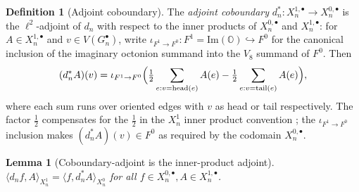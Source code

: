 \documentclass[11pt, a4paper]{amsart}
\newtheorem{lemma}[theorem]{Lemma}
\theoremstyle{definition}
\newtheorem{definition}[theorem]{Definition}
\newcommand{\OO}{\mathbb{O}}
\renewcommand{\Im}{\mathrm{Im}}
\begin{document}
\begin{definition}[Adjoint coboundary]
\label{def:coboundary-adjoint}
The \emph{adjoint coboundary} $d_n^* \colon X_n^{1, \bullet} \to
X_n^{0, \bullet}$ is the $\ell^2$-adjoint of $d_n$ with respect
to the inner products of $X_n^{0, \bullet}$ and $X_n^{1, \bullet}$:
for $A \in X_n^{1, \bullet}$ and $v \in V(G_n^\bullet)$, write
$\iota_{F^1 \to F^0} \colon F^1 = \Im(\OO) \hookrightarrow F^0$
for the canonical inclusion of the imaginary octonion summand
into the $V_8$ summand of $F^0$. Then
\[
  (d_n^* A)(v) = \iota_{F^1 \to F^0}\Bigl(
    \tfrac{1}{2} \sum_{e : v = \text{head}(e)}
      A(e) - \tfrac{1}{2} \sum_{e : v = \text{tail}(e)} A(e)\Bigr),
\]
where each sum runs over oriented edges with $v$ as head or tail
respectively. The factor $\tfrac{1}{2}$ compensates for the
$\tfrac{1}{2}$ in the $X_n^1$ inner product convention
\cite[Definition~\texttt{def:Xn-1}]{RefinementSpaces}; the
$\iota_{F^1 \to F^0}$ inclusion makes $(d_n^* A)(v) \in F^0$ as
required by the codomain $X_n^{0, \bullet}$.
\end{definition}

\begin{lemma}[Coboundary-adjoint is the inner-product adjoint]
\label{lem:dn-adjoint}
$\langle d_n f, A \rangle_{X_n^1} = \langle f, d_n^* A
\rangle_{X_n^0}$ for all $f \in X_n^{0, \bullet}, A \in
X_n^{1, \bullet}$.
\end{lemma}
\end{document}
